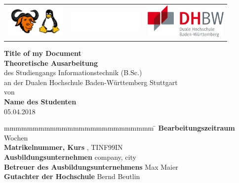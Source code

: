 \documentclass[
a4paper,   
titlepage,  
halfparskip,
12pt        
]{scrartcl}
\begin{document}

\begin{titlepage}
\begin{longtable}{|l|c|r|}
{\includegraphics[height=1.7cm]{logo}} &
{\includegraphics[height=1.05cm]{blank}} &
{\includegraphics[height=1.7cm]{dhbw}}
\end{longtable}
\bigskip
\bigskip
\begin{center}
\vspace*{12mm} {\LARGE\bf Title of my Document}\\
\vspace*{12mm} %
\vspace*{3mm} {\large\bf Theoretische Ausarbeitung}\\
\vspace*{12mm} des Studiengangs Informationstechnik (B.Sc.)\\ an der Dualen Hochschule Baden-Württemberg Stuttgart\\
\vspace*{12mm} von\\
\vspace*{3mm} {\large\bf Name des Studenten}\\
\vspace*{12mm} 05.04.2018\\
\end{center}
\vfill
\begin{spacing}{1.5}
\begin{tabbing}
mmmmmmmmmmmmmmmmmmmmmmmmmm \= \kill
\textbf{Bearbeitungszeitraum}  Wochen\\
\textbf{Matrikelnummer, Kurs} , TINF99IN\\
\textbf{Ausbildungsunternehmen} \> company, city\\
\textbf{Betreuer des Ausbildungsunternehmens} \> Max Maier\\
\textbf{Gutachter der Hochschule} \> Bernd Beutlin\\
\end{tabbing}
\end{spacing}
\end{titlepage}
\end{document}
